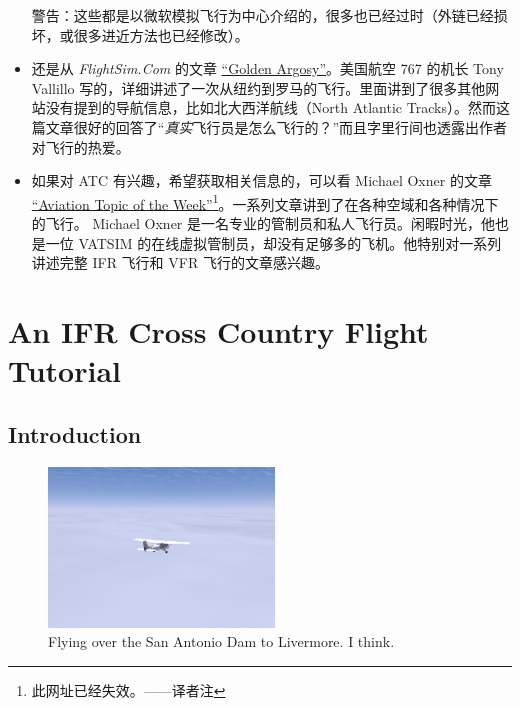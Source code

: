 \begin{itemize}
警告：这些都是以微软模拟飞行为中心介绍的，很多也已经过时（外链已经损坏，或很多进近方法也已经修改）。

\item 还是从 \textit{FlightSim.Com} 的文章 \href{http://www.flightsim.com/vbfs/content.php?1756}{``Golden Argosy''}。美国航空 767 的机长 Tony Vallillo 写的，详细讲述了一次从纽约到罗马的飞行。里面讲到了很多其他网站没有提到的导航信息，比如北大西洋航线（North Atlantic Tracks）。然而这篇文章很好的回答了“\emph{真实}飞行员是怎么飞行的？”而且字里行间也透露出作者对飞行的热爱。
\item 如果对 ATC 有兴趣，希望获取相关信息的，可以看 Michael Oxner 的文章 \href{http://bathursted.ccnb.nb.ca/vatcan/fir/moncton/WeeklyTopics/WeeklyTopicIntro.html}{``Aviation Topic of the Week''}\footnote{此网址已经失效。——译者注}。一系列文章讲到了在各种空域和各种情况下的飞行。 Michael Oxner 是一名专业的管制员和私人飞行员。闲暇时光，他也是一位 VATSIM 的在线虚拟管制员，却没有足够多的飞机。他特别对一系列讲述完整 IFR 飞行和 VFR 飞行的文章感兴趣。
\end{itemize}

\fi
\iffalse
\chapter{An IFR Cross Country Flight Tutorial}
\label{IFR Tutorial}

\section{Introduction}

\begin{figure}[h]
  \begin{center}
    \includegraphics[width=6cm]{img/somewhere}
    \caption{Flying over the San Antonio Dam to Livermore.  I think.}
    \label{fig:somewhere}
  \end{center}
\end{figure}

